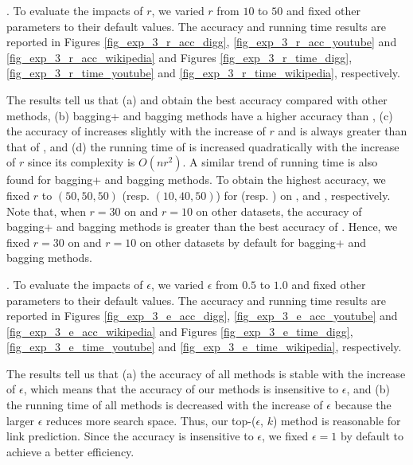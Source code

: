 . To evaluate the impacts of $r$, we
varied $r$ from $10$ to $50$ and fixed other parameters to their
default values. The accuracy and running time results are reported in
Figures \ref{fig_exp_3_r_acc_digg}, \ref{fig_exp_3_r_acc_youtube} and \ref{fig_exp_3_r_acc_wikipedia} and
Figures \ref{fig_exp_3_r_time_digg}, \ref{fig_exp_3_r_time_youtube} and \ref{fig_exp_3_r_time_wikipedia}, respectively.


The results tell us that (a) \Biasedp and \Biased obtain the best accuracy
compared with other methods, (b) bagging+ and bagging methods have a higher accuracy
than \BIGCLAM, (c) the accuracy of \NMF increases slightly with the increase of $r$ and is always
greater than that of \BIGCLAM, and (d) the running time of \NMF is increased
quadratically with the increase of $r$ since its complexity is $O(nr^2)$.
A similar trend of running time is also found for bagging+ and bagging methods.
To obtain the highest accuracy, we fixed $r$ to $(50, 50, 50)$ (resp. $(10, 40, 50)$)
for \NMF (resp. \BIGCLAM) on \Digg, \YouTube and \Wikipedia, respectively.
Note that, when $r = 30$ on \Digg and $r = 10$ on other datasets, the accuracy
of bagging+ and bagging methods is greater than the best accuracy of \NMF. Hence, we
fixed $r = 30$ on \Digg and $r = 10$ on other datasets by default for bagging+ and bagging methods.






. To evaluate the impacts of $\epsilon$, we
varied $\epsilon$ from $0.5$ to $1.0$ and fixed other parameters to their
default values. The accuracy and running time results are reported in
Figures \ref{fig_exp_3_e_acc_digg}, \ref{fig_exp_3_e_acc_youtube} and \ref{fig_exp_3_e_acc_wikipedia} and
Figures \ref{fig_exp_3_e_time_digg}, \ref{fig_exp_3_e_time_youtube} and \ref{fig_exp_3_e_time_wikipedia}, respectively.



The results tell us that (a) the accuracy of all methods is stable with
the increase of $\epsilon$, which means that the accuracy of our methods is insensitive
to $\epsilon$, and (b) the running time of all methods is decreased with the increase of $\epsilon$
because the larger $\epsilon$ reduces more search space. Thus, our top-($\epsilon$, $k$)
method is reasonable for link prediction. Since the accuracy is insensitive to $\epsilon$, we
fixed $\epsilon = 1$ by default to achieve a better efficiency.




